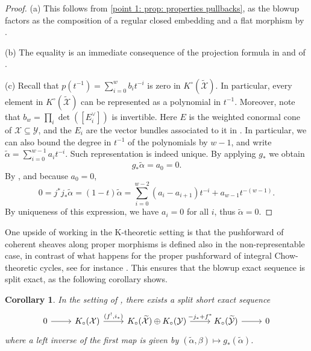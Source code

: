 \documentclass[12pt]{amsart}
\newcommand{\cX}{\mathcal{X}}
\newcommand{\cY}{\mathcal{Y}}
\newcommand{\Kring}{K^{\circ}}
\newcommand{\Kgroup}{K_{\circ}}
\newtheorem{Cor}[theorem]{Corollary}
\theoremstyle{definition}
\begin{document}
\begin{proof}
(a) This follows from \eqref{point 1: prop: properties pullbacks}, as the blowup factors as the composition of a regular closed embedding and a flat morphism by .

(b) The equality is an immediate consequence of the projection formula in  and of .

(c) Recall that $p(t^{-1})=\sum_{i=0}^w b_i t^{-i}$ is zero in $\Kring(\widetilde{\cX})$. In particular, every element in $\Kring(\widetilde{\cX})$ can be represented as a polynomial in $t^{-1}$. Moreover, note that $b_w = \prod_i \det([E_i^\vee])$ is invertible. Here $E$ is the weighted conormal cone of $\cX \subseteq \cY$, and the $E_i$ are the vector bundles associated to it in . In particular, we can also bound the degree in $t^{-1}$ of the polynomials by $w-1$, and write $\widetilde \alpha = \sum_{i=0}^{w-1} a_it^{-i}$. Such representation is indeed unique.
By applying $g_*$ we obtain $$g_*\widetilde \alpha=a_0=0.$$ By , and because $a_0=0$,
$$
0=j^*j_*\widetilde \alpha = (1-t)\widetilde \alpha = \sum_{i=0}^{w-2}(a_i-a_{i+1})t^{-i}+a_{w-1}t^{-(w-1)}.$$
By uniqueness of this expression, we have $a_i=0$ for all $i$, thus $\widetilde\alpha=0$.
\end{proof}

One upside of working in the K-theoretic setting is that the pushforward of coherent sheaves along proper morphisms is defined also in the non-representable case, in contrast of what happens for the proper pushforward of integral Chow-theoretic cycles, see for instance \cite[Example 6.2]{Arena-Obinna}. This ensures that the blowup exact sequence is split exact, as the following corollary shows. 

\begin{Cor}\label{cor: main exact sequence}
    In the setting of , there exists a split short exact sequence
    $$ 
  \begin{tikzcd}
0 \arrow[r] & \Kgroup(\cX) \arrow[r, "{(f^!, i_*)}"] & \Kgroup(\widetilde{\cX})\oplus \Kgroup(\cY)  \arrow[r, "-j_*+f^*"] & \Kgroup(\widetilde{\cY}) \arrow[r] & 0
\end{tikzcd}
    $$
    where a left inverse of the first map is given by $(\widetilde{\alpha},\beta)\mapsto g_*(\widetilde{\alpha})$.
\end{Cor}
\end{document}
